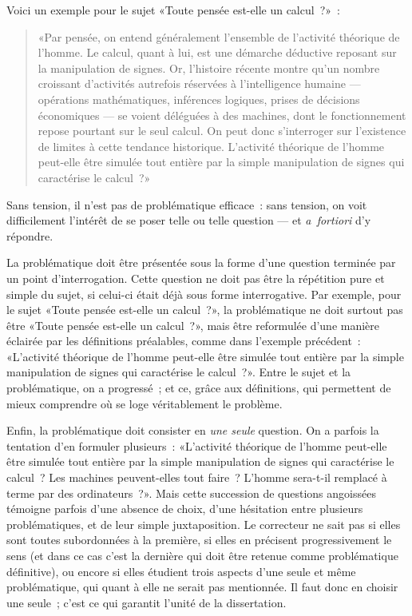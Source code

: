 \documentclass[a4paper,11pt]{article}
\begin{document}
\par

Voici un exemple pour le sujet «Toute pensée est-elle un calcul~?»~:
\begin{quote}
  «Par pensée, on entend généralement l'ensemble de l'activité théorique
  de l'homme. Le calcul, quant à lui, est une démarche déductive
  reposant sur la manipulation de signes. Or, l'histoire récente montre
  qu'un nombre croissant d'activités autrefois réservées à
  l'intelligence humaine --- opérations mathématiques, inférences
  logiques, prises de décisions économiques --- se voient déléguées à
  des machines, dont le fonctionnement repose pourtant sur le seul
  calcul. On peut donc s'interroger sur l'existence de limites à cette
  tendance historique. L'activité théorique de l'homme peut-elle être
  simulée tout entière par la simple manipulation de signes qui
  caractérise le calcul~?»
\end{quote}

Sans tension, il n'est pas de problématique efficace~: sans tension, on
voit difficilement l'intérêt de se poser telle ou telle question --- et
\emph{a~fortiori} d'y répondre. 

\par

La problématique doit être présentée sous la forme d'une question
terminée par un point d'interrogation.  Cette question ne doit pas être
la répétition pure et simple du sujet, si celui-ci était déjà sous forme
interrogative. Par exemple, pour le sujet «Toute pensée est-elle un
calcul~?», la problématique ne doit surtout pas être «Toute pensée
est-elle un calcul~?», mais être reformulée d'une manière éclairée par
les définitions préalables, comme dans l'exemple précédent~: «L'activité
théorique de l'homme peut-elle être simulée tout entière par la simple
manipulation de signes qui caractérise le calcul~?». Entre le sujet et
la problématique, on a progressé~; et ce, grâce aux définitions, qui
permettent de mieux comprendre où se loge véritablement le problème.

\par

Enfin, la problématique doit consister en \emph{une seule} question. On
a parfois la tentation d'en formuler plusieurs~: «L'activité théorique
de l'homme peut-elle être simulée tout entière par la simple
manipulation de signes qui caractérise le calcul~? Les machines
peuvent-elles tout faire~? L'homme sera-t-il remplacé à terme par des
ordinateurs~?». Mais cette succession de questions angoissées témoigne
parfois d'une absence de choix, d'une hésitation entre plusieurs
problématiques, et de leur simple juxtaposition. Le correcteur ne sait
pas si elles sont toutes subordonnées à la première, si elles en
précisent progressivement le sens (et dans ce cas c'est la dernière qui
doit être retenue comme problématique définitive), ou encore si elles
étudient trois aspects d'une seule et même problématique, qui quant à
elle ne serait pas mentionnée. Il faut donc en choisir une seule~; c'est
ce qui garantit l'unité de la dissertation.
\end{document}
